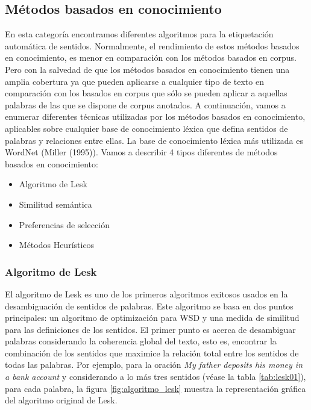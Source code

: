 \subsection{Métodos basados en conocimiento}
En esta categoría encontramos diferentes algoritmos para la etiquetación automática de sentidos. Normalmente, el rendimiento de estos métodos basados en conocimiento, es menor en comparación con los métodos basados en corpus. Pero con la salvedad de que los métodos basados en conocimiento tienen una amplia cobertura ya que pueden aplicarse a cualquier tipo de texto en comparación con los basados en corpus que sólo se pueden aplicar a aquellas palabras de las que se dispone de corpus anotados. A continuación, vamos a enumerar diferentes técnicas utilizadas por los métodos basados en conocimiento, aplicables sobre cualquier base de conocimiento léxica que defina sentidos de palabras y relaciones entre ellas. La base de conocimiento léxica más utilizada es WordNet (Miller (1995)). Vamos a describir 4 tipos diferentes de métodos basados en conocimiento:

\begin{itemize}
  \item Algoritmo de Lesk
  \item Similitud semántica
  \item Preferencias de selección
  \item Métodos Heurísticos
\end{itemize}

\subsubsection{Algoritmo de Lesk}
El algoritmo de Lesk \cite{002} es uno de los primeros algoritmos exitosos usados en la desambiguación de sentidos de palabras. Este algoritmo se basa en dos puntos principales: un algoritmo de optimización para WSD y una medida de similitud para las definiciones de los sentidos.
El primer punto es acerca de desambiguar palabras considerando la coherencia global del texto, esto es, encontrar la combinación de los sentidos que maximice la relación total entre los sentidos de todas las palabras.
Por ejemplo, para la oración \textit{My father deposits his money in a bank account} y considerando a lo más tres sentidos (véase la tabla \ref{tab:lesk01}), para cada palabra, la figura \ref{fig:algoritmo_lesk} muestra la representación gráfica del algoritmo original de Lesk.

